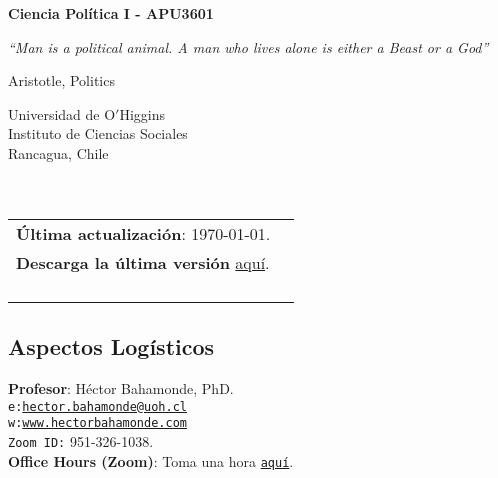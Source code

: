 \documentclass[letterpaper]{article}
\def\name{Ciencia Pol\'itica I - APU3601}
\begin{document}

\centerline{\huge \bf \name}

\epigraph{\emph{``Man is a political animal. A man who lives alone is either a Beast or a God''}}{Aristotle, Politics}


\vspace{0.25in}

\begin{minipage}{0.45\linewidth}
 Universidad de O$'$Higgins \\
  Instituto de Ciencias Sociales \\
  Rancagua, Chile\\
  \\
  \\

\end{minipage}
\hspace{4cm}\begin{minipage}{0.45\linewidth}
  \begin{tabular}{ll}
{\bf \'Ultima actualizaci\'on}: \today. \\
 {\bf Descarga la \'ultima versi\'on} \href{https://github.com/hbahamonde/Ciencia_Politica_I/raw/master/Bahamonde_Ciencia_Politica_I.pdf}{aqu\'i}.%
    \\
    \\
    \\
    \\
    \\
  \end{tabular}
\end{minipage}



\subsection*{Aspectos Log\'isticos}


\vspace{0.8mm}
{\bf Profesor}: H\'ector Bahamonde, PhD.\\
\texttt{e:}\href{mailto:hector.bahamonde@uoh.cl}{\texttt{hector.bahamonde@uoh.cl}}\\
\texttt{w:}\href{http://www.hectorbahamonde.com}{\texttt{www.hectorbahamonde.com}}\\
\texttt{Zoom ID:} 951-326-1038.\\
{\bf Office Hours (Zoom)}: Toma una hora \href{https://calendly.com/bahamonde/officehours}{\texttt{aqu\'i}}.
\end{document}

